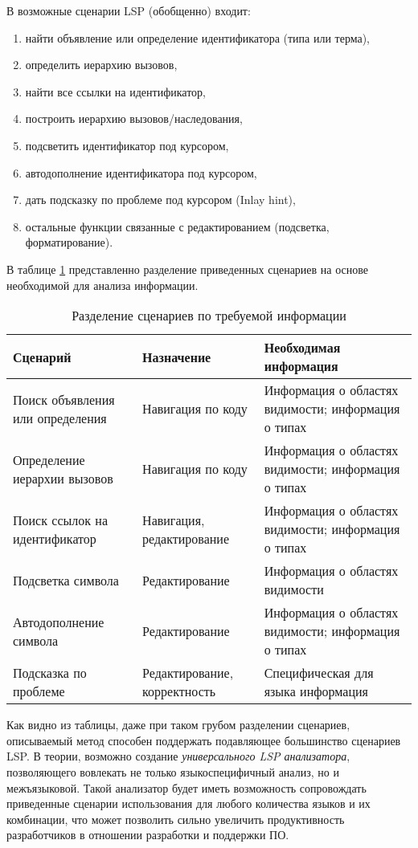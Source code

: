 В возможные сценарии LSP (обобщенно) входит:
\begin{enumerate}[1)]
    \item найти объявление или определение идентификатора (типа или терма),
    \item определить иерархию вызовов,
    \item найти все ссылки на идентификатор,
    \item построить иерархию вызовов/наследования,
    \item подсветить идентификатор под курсором,
    \item автодополнение идентификатора под курсором,
    \item дать подсказку по проблеме под курсором (Inlay hint),
    \item остальные функции связанные с редактированием (подсветка, форматирование).
\end{enumerate}


В таблице \ref{lsp_functionality} представленно разделение приведенных сценариев на основе необходимой для анализа информации.
\begin{table}[H]
    \caption{Разделение сценариев по требуемой информации}\label{lsp_functionality}
    \begin{tabular}{|p{5.0cm}|p{5.0cm}|p{5.0cm}|}
    \hline Сценарий & Назначение & Необходимая информация \\
    \hline Поиск объявления или определения & Навигация по коду & Информация о областях видимости; информация о типах \\
    \hline Определение иерархии вызовов & Навигация по коду & Информация о областях видимости; информация о типах \\
    \hline Поиск ссылок на идентификатор & Навигация, редактирование & Информация о областях видимости; информация о типах \\
    \hline Подсветка символа & Редактирование & Информация о областях видимости \\
    \hline Автодополнение символа & Редактирование & Информация о областях видимости; информация о типах \\
    \hline Подсказка по проблеме & Редактирование, корректность & Специфическая для языка информация \\
    \hline
    \end{tabular}
\end{table}

Как видно из таблицы, даже при таком грубом разделении сценариев, описываемый метод способен поддержать подавляющее
большинство сценариев LSP. В теории, возможно создание \textit{универсального LSP анализатора}, позволяющего вовлекать не только
языкоспецифичный анализ, но и межъязыковой. Такой анализатор будет иметь возможность сопровождать приведенные сценарии использования
для любого количества языков и их комбинации, что может позволить сильно увеличить продуктивность разработчиков в отношении
разработки и поддержки ПО.

\clearpage